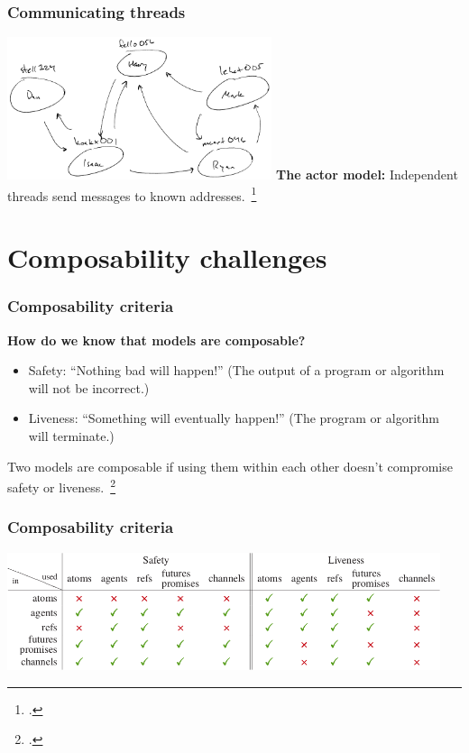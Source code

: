 \documentclass[aspectratio=1610]{beamer}
\begin{document}
  \begin{frame}
    \frametitle{Communicating threads}
    \centering

    \includegraphics[width=220pt]{../figures/actor}
    \vfill
    \textbf{The actor model:} Independent threads send messages to known addresses.~\footcite{Agha1986}
  \end{frame}

  \section{Composability challenges}

  \begin{frame}
    \frametitle{Composability criteria}

    \textbf{How do we know that models are composable?}

    \begin{itemize}
      \item Safety: ``Nothing bad will happen!'' (The output of a program or algorithm will not be incorrect.)
      \item Liveness: ``Something will eventually happen!'' (The program or algorithm will terminate.)
    \end{itemize}

    Two models are composable if using them within each other doesn't compromise safety or liveness.~\footcite{Swalens2014}
  \end{frame}

  \begin{frame}
    \frametitle{Composability criteria}
    \centering

    \includegraphics[width=360pt]{../figures/clojure-survey}
  \end{frame}
\end{document}
